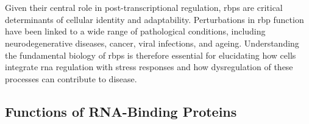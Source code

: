 \\
\\
Given their central role in post-transcriptional regulation, \glspl{rbp} are critical determinants of cellular identity and adaptability\cite{holmqvist_rna-binding_2018, kelaini_rna-binding_2021, babitzke_regulation_2009}. Perturbations in \gls{rbp} function have been linked to a wide range of pathological conditions, including neurodegenerative diseases, cancer, viral infections, and ageing\cite{kelaini_rna-binding_2021, redding_stress_2023, wear_proteins_2015, marcelo_stress_2021}. Understanding the fundamental biology of \glspl{rbp} is therefore essential for elucidating how cells integrate \gls{rna} regulation with stress responses and how dysregulation of these processes can contribute to disease.

\subsection{Functions of RNA-Binding Proteins}

